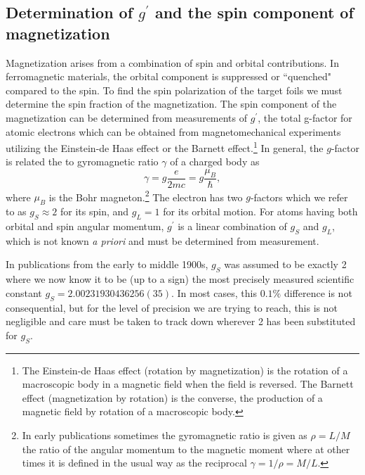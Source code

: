 \documentclass[preprint,12pt]{elsarticle}
\begin{document}
\subsection{Determination of $g^{\prime}$ and the spin component of magnetization}
Magnetization arises from a combination of spin and orbital contributions. In ferromagnetic materials, the orbital component is suppressed  or ``quenched" compared to the spin. To find the spin polarization of the target foils we must determine the spin fraction of the magnetization. The spin component of the magnetization can be determined from measurements of $g^{\prime}$, the total g-factor for atomic electrons which can be obtained from magnetomechanical experiments utilizing the Einstein-de Haas effect or the Barnett effect.\footnote{The Einstein-de Haas effect (rotation by magnetization) is the rotation of a macroscopic body in a magnetic field when the field is reversed\cite{Richardson1908, Scott1962}. The Barnett effect (magnetization by rotation) is the converse, the production of a magnetic field by rotation of a macroscopic body\cite{Barnett1909, Barnett1944}.} In general, the $g$-factor is related the to gyromagnetic ratio $\gamma$ of a charged body as 
\begin{equation}
\gamma=g\frac{e}{2mc}=g\frac{\mu_B}{\hbar},
\label{eq:gyro}
\end{equation}
where $\mu_B$ is the Bohr magneton.\footnote{In early publications sometimes the gyromagnetic ratio is given as $\rho=L/M$ the ratio of the angular momentum to the magnetic moment where at other times it is defined in the usual way as the reciprocal $\gamma=1/\rho=M/L$.} The electron has two $g$-factors which we refer to as $g_{S}\approx2$ for its spin, and $g_{L}=1$ for its orbital motion. For atoms having both orbital and spin angular momentum, $g^{\prime}$ is a linear combination of $g_{S}$ and $g_{L}$, which is not known {\it a priori} and must be determined from measurement.

In publications from the early to middle 1900s, $g_{S}$ was assumed to be exactly 2 where we now know it to be (up to a sign) the most precisely measured scientific constant $g_{S}=2.00231930436256(35)$. In most cases, this $0.1\%$ difference is not consequential, but for the level of precision we are trying to reach, this is not negligible and care must be taken to track down wherever 2 has been substituted for $g_{S}$. 
\end{document}
